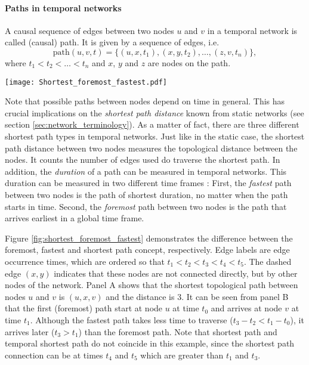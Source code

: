 \paragraph{Paths in temporal networks\color{Cayenne}{.}}
A causal sequence of edges between two nodes $u$ and $v$ in a temporal network is called (causal) path.
It is given by a sequence of edges, i.e.
\[
\mathrm{path}(u,v,t)= \{ (u,x,t_1),(x,y,t_2),\dots ,(z,v,t_n) \}, 
\]
where $ t_1<t_2<\dots <t_n$ and $x$, $y$ and $z$ are nodes on the path.
%
\begin{SCfigure}
\texttt{[image: Shortest\_foremost\_fastest.pdf]}
\caption{Topological shortest distance and temporal shortest durations for a path between nodes $u$ and $v$.
The shortest path (panel A) counts the number of edges between the nodes.
Panel~B demonstrates that although the fastest path could take $t_3-t_2 < t_1-t_0$, the foremost path arrives already at $t_1<t_2$.
}
\label{fig:shortest_foremost_fastest}
\end{SCfigure}

Note that possible paths between nodes depend on time in general.
This has crucial implications on the \emph{shortest path distance} known from static networks (see section  \ref{sec:network_terminology}).
As a matter of fact, there are three different shortest path types in temporal networks.
Just like in the static case, the shortest path distance between two nodes measures the topological distance between the nodes.
It counts the number of edges used do traverse the shortest path.
In addition, the \emph{duration} of a path can be measured in temporal networks.
This duration can be measured in two different time frames \citep{Casteights_review}:
First, the \emph{fastest} path between two nodes is the path of shortest duration, no matter when the path starts in time.
Second, the \emph{foremost} path between two nodes is the path that arrives earliest in a global time frame.

Figure \ref{fig:shortest_foremost_fastest} demonstrates the difference between the foremost, fastest and shortest path concept, respectively.
Edge labels are edge occurrence times, which are ordered so that $t_1<t_2<t_3<t_4<t_5$.
The dashed edge $(x,y)$ indicates that these nodes are not connected directly, but by other nodes of the network.
Panel A shows that the shortest topological path between nodes $u$ and $v$ is $(u,x,v)$ and the distance is $3$.
It can be seen from panel B that the first (foremost) path start at node $u$ at time $t_0$ and arrives at node $v$ at time $t_1$.
Although the fastest path takes less time to traverse ($t_3-t_2<t_1-t_0$), it arrives later ($t_3>t_1$) than the foremost path.
Note that shortest path and temporal shortest path do not coincide in this example, since the shortest path connection can be at times $t_4$ and $t_5$ which are greater than $t_1$ and $t_3$.

